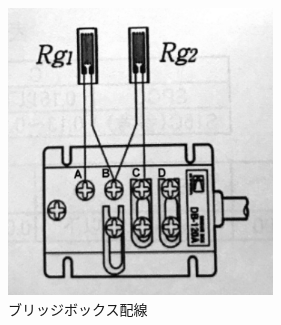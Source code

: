 \documentclass[a4paper,11pt,uplatex]{jsarticle}
\begin{document}
\begin{figure}[H]
  \begin{center}
    \includegraphics[width = 7cm]{画像/ブリッジボックス.png}
    \caption{ブリッジボックス配線}
    \label{ブリッジボックス}
  \end{center}
\end{figure}
\end{document}
